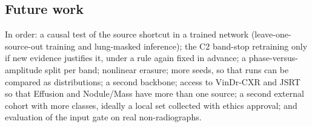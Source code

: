 \subsection{Future work}
In order: a causal test of the source shortcut in a trained network (leave-one-source-out training and lung-masked inference); the C2 band-stop retraining only if new evidence justifies it, under a rule again fixed in advance; a phase-versus-amplitude split per band; nonlinear erasure; more seeds, so that runs can be compared as distributions; a second backbone; access to VinDr-CXR and JSRT so that Effusion and Nodule/Mass have more than one source; a second external cohort with more classes, ideally a local set collected with ethics approval; and evaluation of the input gate on real non-radiographs.
